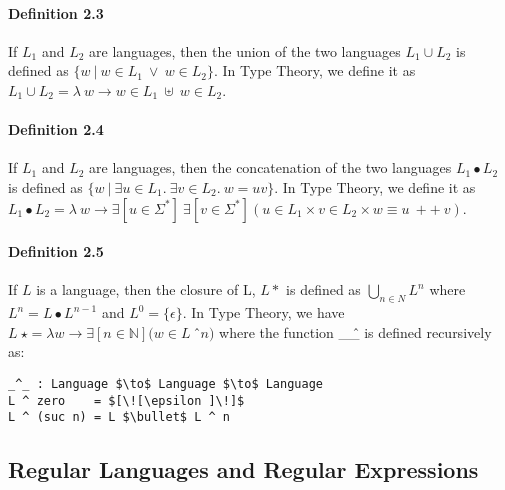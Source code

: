 \paragraph{Definition 2.3} If \(L_1\) and \(L_2\) are languages, then
the union of the two languages \(L_1\cup L_2\) is defined as \(\{w\
|\  w \in L_1\ \vee \ w \in
L_2\}\). In Type Theory, we define it as \(L_1 \cup L_2 = \lambda\ w
\to w \in L_1\ \uplus\ w \in L_2\).

\paragraph{Definition 2.4} If \(L_1\) and \(L_2\) are languages, then
the concatenation of the two languages \(L_1\bullet L_2\) is defined
as \(\{w\  |\  \exists u\in L_1.\ \exists v\in L_2.\ w = uv\}\). In
Type Theory, we define it as \(L_1\bullet L_2 = \lambda\ w \to \exists[
u \in \Sigma^* ]\ \exists[ v \in \Sigma^* ] ( u \in L_1 \times v \in L_2 \times w \equiv u\ ++\ v ) \).

\paragraph{Definition 2.5} If \(L\) is a language, then the closure of
L, \(L\ast\) is defined as \( \bigcup_{n \in N} L^n \) where
\( L^n = L\bullet L^{n - 1} \) and \(L^0 = \{\epsilon\}\). In Type
Theory, we have \(L\ \star = \lambda w \to \exists [ n \in \mathbb{N}
]( w \in L\ \)\^\ \(n)\) where the function \_\^ \_ is defined
recursively as: 
\begin{lstlisting}[mathescape=true,xleftmargin=.3\textwidth,aboveskip=0pt,belowskip=0pt]
_^_ : Language $\to$ Language $\to$ Language
L ^ zero    = $[\![\epsilon ]\!]$
L ^ (suc n) = L $\bullet$ L ^ n
\end{lstlisting}

\subsection{Regular Languages and Regular Expressions}

